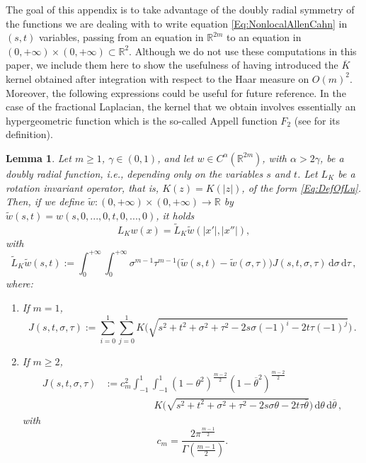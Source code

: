 \documentclass[12pt,reqno]{amsart}
\newtheorem{lemma}[theorem]{Lemma}
\theoremstyle{definition}
\theoremstyle{remark}
\newcommand{\con}[1]{\mathbb{#1}}
\newcommand{\R}{\con{R}} %
\newcommand{\s}{\gamma}
\renewcommand{\d}{\,\mathrm{d}} %
\numberwithin{equation}{section}
\begin{document}
	The goal of this appendix is to take advantage of the doubly radial symmetry of the functions we are dealing with to write equation \eqref{Eq:NonlocalAllenCahn} in $(s,t)$ variables, passing from an equation in $\R^{2m}$ to an equation in $(0,+\infty)\times (0,+\infty)\subset \R^2$. Although we do not use these computations in this paper, we include them here to show the usefulness of having introduced the $\overline{K}$ kernel obtained after integration with respect to the Haar measure on $O(m)^2$. Moreover, the following expressions could be useful for future reference. In the case of the fractional Laplacian, the kernel that we obtain involves essentially an hypergeometric function which is the so-called Appell function $F_2$ (see \cite{Appell} for its definition).
	
	\begin{lemma}
		\label{Lemma:OperatorInSTVariables} Let $m \geq 1$, $\s\in(0,1)$, and let $w\in
		C^\alpha(\R^{2m})$, with $\alpha > 2\s$, be a doubly radial function, i.e., depending only on the variables $s$ and $t$. Let $L_K$ be a rotation invariant operator, that is, $K(z) = K(|z|)$, of the form \eqref{Eq:DefOfLu}. Then, if we define $\tilde{w}:(0,+\infty)\times (0,+\infty) \to \R$ by $\tilde{w}(s,t) = w(s,0,...,0,t,0,...,0)$, it holds
		$$ L_Kw(x) = \tilde{L}_K \tilde{w} (|x'|,|x''|), $$
		with
		\begin{equation*}
		\label{Eq:OperatorInSTVariables}
		\widetilde{L}_K \tilde{w} (s,t) := \int_0^{+\infty}  \int_0^{+\infty} \sigma^{m-1} \tau^{m-1} \big(\tilde{w}(s,t) - \tilde{w}(\sigma, \tau)\big) J(s,t,\sigma, \tau)  \d \sigma\d \tau\,,
		\end{equation*}
		where:
		\begin{enumerate}
			\item If $m= 1$,
			\begin{equation}
			\label{Eq:KernelSTVariables1}
			J(s,t,\sigma, \tau) := \sum_{i=0}^1  \sum_{j =0}^1  K\Big(\sqrt{s^2 + t^2 + \sigma^2 + \tau^2 -2 s \sigma (-1)^i -2 t \tau (-1)^j}\Big)\,.
			\end{equation}
			
			\item If $m\geq 2$,
			\begin{align}
			J(s,t,\sigma, \tau) &:= c_m ^2  \int_{-1}^1  \int_{-1}^1  (1-\theta^2)^{\frac{m-2}{2}} (1-\overline{\theta}^2)^{\frac{m-2}{2}} \nonumber\\
			& \quad \quad \quad \quad \quad
			K\Big(\sqrt{s^2 + t^2 + \sigma^2 + \tau^2 -2 s \sigma \theta -2 t \tau \overline{\theta}}\Big) \d \theta \d \overline{\theta}\,, \label{Eq:KernelSTVariables2}
			\end{align}
			with
			$$
			c_m = \dfrac{2 \pi^{\frac{m-1}{2}}}{\Gamma (\frac{m-1}{2})}.
			$$
		\end{enumerate}
	\end{lemma}
	
\end{document}

